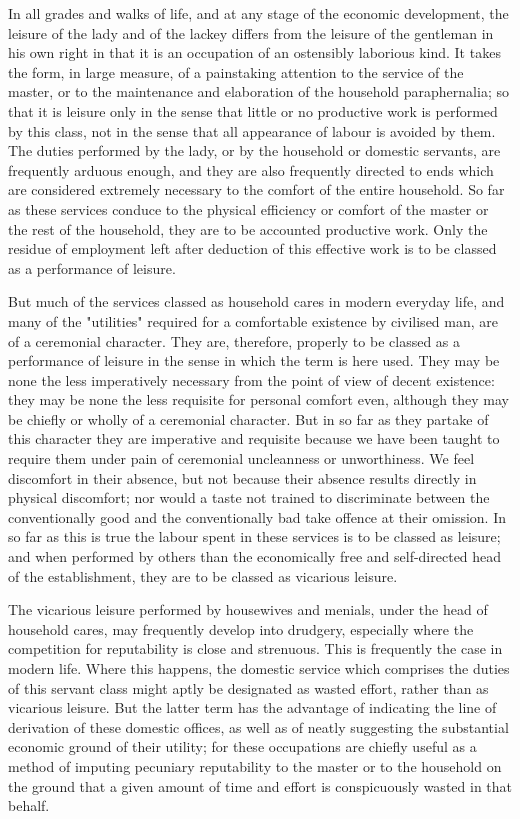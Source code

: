 \documentclass[12pt]{report}
\begin{document}
In all grades and walks of life, and at any stage of the economic
development, the leisure of the lady and of the lackey differs from the
leisure of the gentleman in his own right in that it is an occupation of
an ostensibly laborious kind. It takes the form, in large measure, of
a painstaking attention to the service of the master, or to the
maintenance and elaboration of the household paraphernalia; so that
it is leisure only in the sense that little or no productive work is
performed by this class, not in the sense that all appearance of
labour is avoided by them. The duties performed by the lady, or by the
household or domestic servants, are frequently arduous enough, and they
are also frequently directed to ends which are considered extremely
necessary to the comfort of the entire household. So far as these
services conduce to the physical efficiency or comfort of the master
or the rest of the household, they are to be accounted productive work.
Only the residue of employment left after deduction of this effective
work is to be classed as a performance of leisure.

But much of the services classed as household cares in modern everyday
life, and many of the "utilities" required for a comfortable existence
by civilised man, are of a ceremonial character. They are, therefore,
properly to be classed as a performance of leisure in the sense in which
the term is here used. They may be none the less imperatively necessary
from the point of view of decent existence: they may be none the less
requisite for personal comfort even, although they may be chiefly or
wholly of a ceremonial character. But in so far as they partake of this
character they are imperative and requisite because we have been taught
to require them under pain of ceremonial uncleanness or unworthiness. We
feel discomfort in their absence, but not because their absence results
directly in physical discomfort; nor would a taste not trained to
discriminate between the conventionally good and the conventionally bad
take offence at their omission. In so far as this is true the labour
spent in these services is to be classed as leisure; and when performed
by others than the economically free and self-directed head of the
establishment, they are to be classed as vicarious leisure.

The vicarious leisure performed by housewives and menials, under
the head of household cares, may frequently develop into drudgery,
especially where the competition for reputability is close and
strenuous. This is frequently the case in modern life. Where this
happens, the domestic service which comprises the duties of this
servant class might aptly be designated as wasted effort, rather than as
vicarious leisure. But the latter term has the advantage of indicating
the line of derivation of these domestic offices, as well as of neatly
suggesting the substantial economic ground of their utility; for
these occupations are chiefly useful as a method of imputing pecuniary
reputability to the master or to the household on the ground that a
given amount of time and effort is conspicuously wasted in that behalf.
\end{document}
